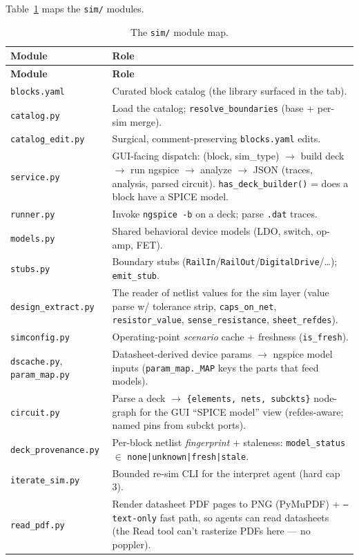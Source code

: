 \documentclass[11pt]{article}
\newcommand{\file}[1]{\texttt{#1}}
\newcommand{\mod}[1]{\texttt{#1}}
\begin{document}
Table~\ref{tab:simmods} maps the \file{sim/} modules.

\begin{longtable}{p{} p{}}
\caption{The \file{sim/} module map.}\label{tab:simmods}\\
\toprule
\textbf{Module} & \textbf{Role}\\
\midrule
\endfirsthead
\toprule
\textbf{Module} & \textbf{Role}\\
\midrule
\endhead
\mod{blocks.yaml} & Curated block catalog (the library surfaced in the tab).\\
\mod{catalog.py} & Load the catalog; \texttt{resolve\_boundaries} (base + per-sim merge).\\
\mod{catalog\_edit.py} & Surgical, comment-preserving \file{blocks.yaml} edits.\\
\mod{service.py} & GUI-facing dispatch: (block, sim\_type) $\to$ build deck $\to$ run ngspice $\to$ analyze $\to$ JSON (traces, analysis, parsed circuit). \texttt{has\_deck\_builder()} = does a block have a SPICE model.\\
\mod{runner.py} & Invoke \texttt{ngspice -b} on a deck; parse \texttt{.dat} traces.\\
\mod{models.py} & Shared behavioral device models (LDO, switch, op-amp, FET).\\
\mod{stubs.py} & Boundary stubs (\texttt{RailIn}/\texttt{RailOut}/\texttt{DigitalDrive}/\dots); \texttt{emit\_stub}.\\
\mod{design\_extract.py} & The reader of netlist values for the sim layer (value parse w/ tolerance strip, \texttt{caps\_on\_net}, \texttt{resistor\_value}, \texttt{sense\_resistance}, \texttt{sheet\_refdes}).\\
\mod{simconfig.py} & Operating-point \emph{scenario} cache + freshness (\texttt{is\_fresh}).\\
\mod{dscache.py}, \mod{param\_map.py} & Datasheet-derived device params $\to$ ngspice model inputs (\texttt{param\_map.\_MAP} keys the parts that feed models).\\
\mod{circuit.py} & Parse a deck $\to$ \texttt{\{elements, nets, subckts\}} node-graph for the GUI ``SPICE model'' view (refdes-aware; named pins from subckt ports).\\
\mod{deck\_provenance.py} & Per-block netlist \emph{fingerprint} + staleness: \texttt{model\_status} $\in$ \texttt{none|unknown|fresh|stale}.\\
\mod{iterate\_sim.py} & Bounded re-sim CLI for the interpret agent (hard cap 3).\\
\mod{read\_pdf.py} & Render datasheet PDF pages to PNG (PyMuPDF) + \texttt{--text-only} fast path, so agents can read datasheets (the Read tool can't rasterize PDFs here --- no poppler).\\
\bottomrule
\end{longtable}
\end{document}
